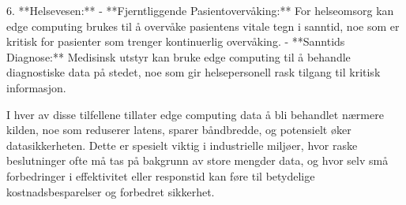 6. **Helsevesen:**
   - **Fjerntliggende Pasientovervåking:** For helseomsorg kan edge computing brukes til å overvåke pasientens vitale tegn i sanntid, noe som er kritisk for pasienter som trenger kontinuerlig overvåking.
   - **Sanntids Diagnose:** Medisinsk utstyr kan bruke edge computing til å behandle diagnostiske data på stedet, noe som gir helsepersonell rask tilgang til kritisk informasjon.

I hver av disse tilfellene tillater edge computing data å bli behandlet nærmere kilden, noe som reduserer latens, sparer båndbredde, og potensielt øker datasikkerheten. Dette er spesielt viktig i industrielle miljøer, hvor raske beslutninger ofte må tas på bakgrunn av store mengder data, og hvor selv små forbedringer i effektivitet eller responstid kan føre til betydelige kostnadsbesparelser og forbedret sikkerhet.
